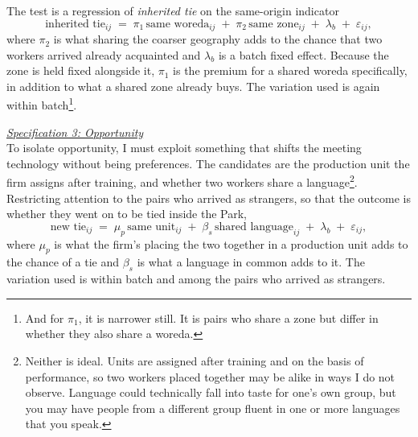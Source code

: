 \noindent The test is a regression of \textit{inherited tie} on the same-origin indicator
\begin{equation}
\label{eq:strategy-import}
\text{inherited tie}_{ij} \;=\; \pi_1\,\text{same woreda}_{ij} \;+\; \pi_2\,\text{same zone}_{ij} \;+\; \lambda_{b} \;+\; \varepsilon_{ij},
\end{equation}
where $\pi_2$ is what sharing the coarser geography adds to the chance that two workers arrived already acquainted and $\lambda_b$ is a batch fixed effect. Because the zone is held fixed alongside it, $\pi_1$ is the premium for a shared woreda specifically, in addition to what a shared zone already buys. The variation used is again within batch\footnote{And for $\pi_1$, it is narrower still. It is pairs who share a zone but differ in whether they also share a woreda.}.  \\
\clearpage


\noindent \underline{\textit{Specification 3: Opportunity}} \\[0.4em]
To isolate opportunity, I must exploit something that shifts the meeting technology without being preferences. The candidates are the production unit the firm assigns after training, and whether two workers share a language\footnote{Neither is ideal. Units are assigned after training and on the basis of performance, so two workers placed together may be alike in ways I do not observe. Language could technically fall into taste for one's own group, but you may have people from a different group fluent in one or more languages that you speak.}. \\

\noindent Restricting attention to the pairs who arrived as strangers, so that the outcome is whether they went on to be tied inside the Park,
\begin{equation}
\label{eq:strategy-opp}
\text{new tie}_{ij} \;=\; \mu_p\,\text{same unit}_{ij} \;+\; \beta_s\,\text{shared language}_{ij} \;+\; \lambda_{b} \;+\; \varepsilon_{ij},
\end{equation}
 where $\mu_p$ is what the firm's placing the two together in a production unit adds to the chance of a tie and $\beta_s$ is what a language in common adds to it. The variation used is within batch and among the pairs who arrived as strangers. \\


